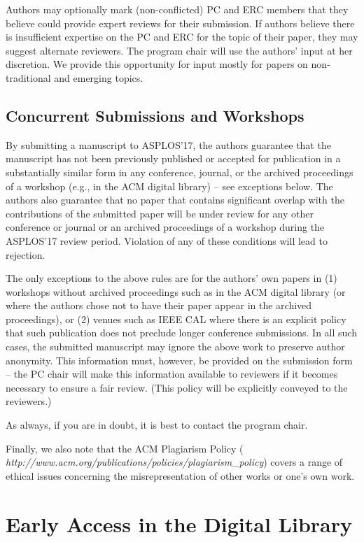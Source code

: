\documentclass[pageno]{jpaper}
\begin{document}
Authors may optionally mark (non-conflicted) PC and ERC members that they
believe could provide expert reviews for their submission.  If authors
believe there is insufficient expertise on the PC and ERC for the topic of
their paper, they may suggest alternate reviewers.  The program chair will
use the authors' input at her discretion.  We provide this opportunity
for input mostly for papers on non-traditional and emerging topics.


\subsection{Concurrent Submissions and Workshops}

By submitting a manuscript to ASPLOS'17, the authors guarantee that the
manuscript has not been previously published or accepted for publication in
a substantially similar form in any conference, journal, or the archived
proceedings of a workshop (e.g., in the ACM digital library) -- see
exceptions below. The authors also guarantee that no paper that contains
significant overlap with the contributions of the submitted paper will be
under review for any other conference or journal or an archived proceedings
of a workshop during the ASPLOS'17 review period. Violation of any of these
conditions will lead to rejection.

The only exceptions to the above rules are for the authors' own papers in
(1) workshops without archived proceedings such as in the ACM digital
library (or where the authors chose not to have their paper appear in the
archived proceedings), or (2) venues such as IEEE CAL where there is an
explicit policy that such publication does not preclude longer conference
submissions.  In all such cases, the submitted manuscript may ignore the
above work to preserve author anonymity. This information must, however, be
provided on the submission form -- the PC chair will make this information
available to reviewers if it becomes necessary to ensure a fair review.
(This policy will be explicitly conveyed to the reviewers.)

As always, if you are in doubt, it is best to contact the program chair.

Finally, we also note that the ACM Plagiarism Policy ({\em
http://www.acm.org/publications/policies/plagiarism\_policy}) covers a
range of ethical issues concerning the misrepresentation of other works or
one's own work.

\section{Early Access in the Digital Library}
\end{document}
